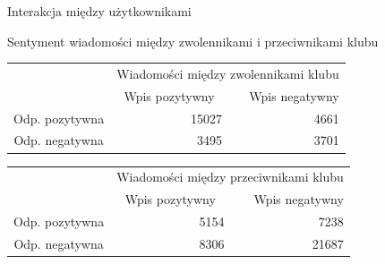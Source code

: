 \documentclass[xcolor=table]{beamer}
\begin{document}
\begin{frame}{Interakcja między użytkownikami}


Sentyment wiadomości między zwolennikami i przeciwnikami klubu

\begin{table}[h]
\begin{tabular}{l|c|r|}
\cline{2-3}
& \multicolumn{2}{c|}{Wiadomości między zwolennikami klubu}          
\\ \cline{2-3} &  
\multicolumn{1}{p{30mm}|}{Wpis pozytywny} &
\multicolumn{1}{p{30mm}|}{Wpis negatywny} \\ \hline

\multicolumn{1}{|c|}{Odp. pozytywna} &
\multicolumn{1}{r|}{\cellcolor[HTML]{34CDF9}15027} & 4661 \\ \hline 
\multicolumn{1}{|c|}{Odp. negatywna} & \multicolumn{1}{r|}{3495} & 3701                                   
\\ \hline
\end{tabular}
\end{table}

\begin{table}[h]
\begin{tabular}{l|c|r|}
\cline{2-3}
& \multicolumn{2}{c|}{Wiadomości między przeciwnikami klubu}          
\\ \cline{2-3} &

\multicolumn{1}{p{30mm}|}{Wpis pozytywny} &
\multicolumn{1}{p{30mm}|}{Wpis negatywny} \\ \hline

\multicolumn{1}{|c|}{Odp. pozytywna} & \multicolumn{1}{r|}{5154} & 7238              
\\ \hline 
\multicolumn{1}{|c|}{Odp. negatywna} & \multicolumn{1}{r|}{8306} &
{\cellcolor[HTML]{34CDF9}21687} \\ \hline
\end{tabular}
\end{table}

\end{frame}
\end{document}
